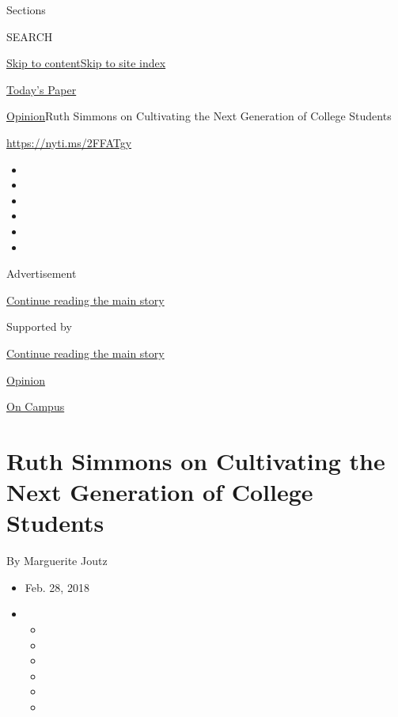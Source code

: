 Sections

SEARCH

\protect\hyperlink{site-content}{Skip to
content}\protect\hyperlink{site-index}{Skip to site index}

\href{https://myaccount.nytimes3xbfgragh.onion/auth/login?response_type=cookie\&client_id=vi}{}

\href{https://www.nytimes3xbfgragh.onion/section/todayspaper}{Today's
Paper}

\href{/section/opinion}{Opinion}\textbar{}Ruth Simmons on Cultivating
the Next Generation of College Students

\url{https://nyti.ms/2FFATgy}

\begin{itemize}
\item
\item
\item
\item
\item
\item
\end{itemize}

Advertisement

\protect\hyperlink{after-top}{Continue reading the main story}

Supported by

\protect\hyperlink{after-sponsor}{Continue reading the main story}

\href{/section/opinion}{Opinion}

\href{/column/on-campus}{On Campus}

\hypertarget{ruth-simmons-on-cultivating-the-next-generation-of-college-students}{%
\section{Ruth Simmons on Cultivating the Next Generation of College
Students}\label{ruth-simmons-on-cultivating-the-next-generation-of-college-students}}

By Marguerite Joutz

\begin{itemize}
\item
  Feb. 28, 2018
\item
  \begin{itemize}
  \item
  \item
  \item
  \item
  \item
  \item
  \end{itemize}
\end{itemize}


